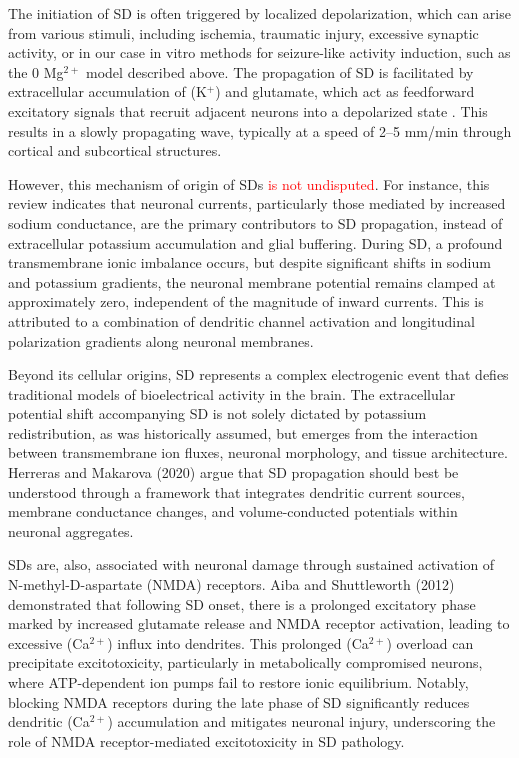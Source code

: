 \documentclass{article}
\begin{document}
The initiation of SD is often triggered by localized depolarization, which can arise from various stimuli, including ischemia, traumatic injury, excessive synaptic activity, or in our case in vitro methods for seizure-like activity induction, such as the 0 \texorpdfstring{Mg$^{2+}$}{Mg2+} model \cite{lu2021} described above. The propagation of SD is facilitated by extracellular accumulation of (K$^+$) and glutamate, which act as feedforward excitatory signals that recruit adjacent neurons into a depolarized state \cite{aiba2012}. This results in a slowly propagating wave, typically at a speed of 2–5 mm/min through cortical and subcortical structures.

However, this mechanism of origin of SDs \textcolor{red}{is not undisputed}. For instance, this review \cite{herreras2020} indicates that neuronal currents, particularly those mediated by increased sodium conductance, are the primary contributors to SD propagation, instead of extracellular potassium accumulation and glial buffering. During SD, a profound transmembrane ionic imbalance occurs, but despite significant shifts in sodium and potassium gradients, the neuronal membrane potential remains clamped at approximately zero, independent of the magnitude of inward currents. This is attributed to a combination of dendritic channel activation and longitudinal polarization gradients along neuronal membranes.

Beyond its cellular origins, SD represents a complex electrogenic event that defies traditional models of bioelectrical activity in the brain. The extracellular potential shift accompanying SD is not solely dictated by potassium redistribution, as was historically assumed, but emerges from the interaction between transmembrane ion fluxes, neuronal morphology, and tissue architecture. Herreras and Makarova (2020) \cite{herreras2020} argue that SD propagation should best be understood through a framework that integrates dendritic current sources, membrane conductance changes, and volume-conducted potentials within neuronal aggregates.

SDs are, also, associated with neuronal damage through sustained activation of N-methyl-D-as\-par\-tate (NMDA) receptors. Aiba and Shuttleworth (2012) \cite{aiba2012} demonstrated that following SD onset, there is a prolonged excitatory phase marked by increased glutamate release and NMDA receptor activation, leading to excessive (Ca$^{2+}$) influx into dendrites. This prolonged (Ca$^{2+}$) overload can precipitate excitotoxicity, particularly in metabolically compromised neurons, where ATP-dependent ion pumps fail to restore ionic equilibrium. Notably, blocking NMDA receptors during the late phase of SD significantly reduces dendritic (Ca$^{2+}$) accumulation and mitigates neuronal injury, underscoring the role of NMDA receptor-mediated excitotoxicity in SD pathology.
\end{document}
